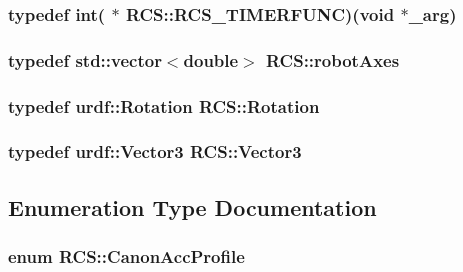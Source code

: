 \hypertarget{namespaceRCS_ae5dd02ab24956844fae02f10de954ad5}{
\subsubsection[{R\-C\-S\-\_\-\-T\-I\-M\-E\-R\-F\-U\-N\-C}]{\setlength{\rightskip}{0pt plus 5cm}typedef int( $\ast$ R\-C\-S\-::\-R\-C\-S\-\_\-\-T\-I\-M\-E\-R\-F\-U\-N\-C)(void $\ast$\-\_\-arg)}}\label{namespaceRCS_ae5dd02ab24956844fae02f10de954ad5}
\hypertarget{namespaceRCS_a3185cefb4d61f5c6f364aaf5624a3ee4}{
\subsubsection[{robot\-Axes}]{\setlength{\rightskip}{0pt plus 5cm}typedef std\-::vector$<$double$>$ {\bf R\-C\-S\-::robot\-Axes}}}\label{namespaceRCS_a3185cefb4d61f5c6f364aaf5624a3ee4}
\hypertarget{namespaceRCS_ae84bcdeffa185f35100e9eca768bd4db}{
\subsubsection[{Rotation}]{\setlength{\rightskip}{0pt plus 5cm}typedef urdf\-::\-Rotation {\bf R\-C\-S\-::\-Rotation}}}\label{namespaceRCS_ae84bcdeffa185f35100e9eca768bd4db}
\hypertarget{namespaceRCS_a3d2e4673086277ee114b9f01ba1664e7}{
\subsubsection[{Vector3}]{\setlength{\rightskip}{0pt plus 5cm}typedef urdf\-::\-Vector3 {\bf R\-C\-S\-::\-Vector3}}}\label{namespaceRCS_a3d2e4673086277ee114b9f01ba1664e7}


\subsection{Enumeration Type Documentation}
\hypertarget{namespaceRCS_a452a9217023e577031dcdf7e533b2ead}{
\subsubsection[{Canon\-Acc\-Profile}]{\setlength{\rightskip}{0pt plus 5cm}enum {\bf R\-C\-S\-::\-Canon\-Acc\-Profile}}}\label{namespaceRCS_a452a9217023e577031dcdf7e533b2ead}


